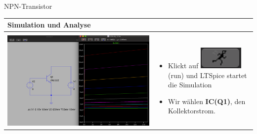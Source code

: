    \begin{frame}[t]{NPN-Transistor}
  
    \begin{spacing}{0.9} \begin{tiny}
    \begin{table}[h!]
      \begin{tabular}{p{5cm} p{5cm}}
        \hline
        \textbf{Simulation und Analyse} & \\
        \hline \\
        \begin{minipage}{.5\textwidth}
          \includegraphics[width=\linewidth]{pictures/analysis_4.png}
        \end{minipage} 
        & 
        \begin{minipage}{.5\textwidth}
        \begin{itemize}
          \item Klickt auf \includegraphics[scale=0.3]{pictures/run.png} (run) und LTSpice startet die Simulation
        \item Wir wählen \textbf{IC(Q1)}, den Kollektorstrom.
        \end{itemize}
        \end{minipage} 
        \\
      \end{tabular}
    \end{table}
  \end{tiny} \end{spacing}
  

\end{frame}
